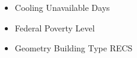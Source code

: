 \begin{itemize}
\item Cooling Unavailable Days
\item Federal Poverty Level
\item Geometry Building Type RECS
\end{itemize}
